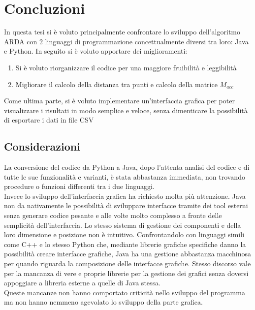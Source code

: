 \chapter{Concluzioni}
In questa tesi si \`e voluto principalmente confrontare lo sviluppo dell'algoritmo
ARDA con 2 linguaggi di programmazione concettualmente diversi tra loro: Java e Python.
In seguito si \`e voluto apportare dei miglioramenti:
\begin{enumerate}
    \item Si \`e voluto riorganizzare il codice per una maggiore fruibilit\`a e leggibilit\`a
    \item Migliorare il calcolo della distanza tra punti e calcolo della matrice $M_{acc}$
\end{enumerate}
Come ultima parte, si \`e voluto implementare un'interfaccia grafica per poter visualizzare
i risultati in modo semplice e veloce, senza dimenticare la possibilit\`a di esportare i
dati in file CSV

\section{Considerazioni}
La conversione del codice da Python a Java, dopo l'attenta analisi del codice e di tutte
le sue funzionalit\`a e varianti, \`e stata abbastanza immediata, non trovando procedure o
funzioni differenti tra i due linguaggi.\\
Invece lo sviluppo dell'interfaccia grafica ha richiesto molta pi\`u attenzione.
Java non da nativamente le possibilit\`a di sviluppare interfacce tramite dei tool esterni
senza generare codice pesante e alle volte molto complesso a fronte delle semplicit\`a dell'interfaccia.
Lo stesso sistema di gestione dei componenti e della loro dimensione e posizione non \`e
intuitivo. Confrontandolo con linguaggi simili come C++ e lo stesso Python che, mediante
librerie grafiche specifiche danno la possibilit\`a creare interfacce grafiche, Java ha una
gestione abbastanza macchinosa per quando riguarda la composizione delle interfacce grafiche.
Stesso discorso vale per la mancanza di vere e proprie librerie per la gestione dei grafici
senza doversi appoggiare a libreria esterne a quelle di Java stessa.\\
Queste mancanze non hanno comportato criticit\`a nello sviluppo del programma ma non hanno
nemmeno agevolato lo sviluppo della parte grafica.

